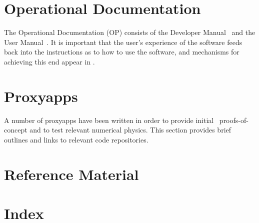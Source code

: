 \chapter{Operational Documentation}\label{sec:OP}
The Operational Documentation (OP) consists of the Developer Manual~ and
the User Manual~. It is important that
the user's experience of the software feeds back into the instructions
as to how to use the software, and mechanisms for achieving this end appear
in .

% 
% 
% 
% 

\chapter{Proxyapps}\label{sec:proxyapps}
A number of proxyapps have been written in order to provide initial \nep \ proofs-of-concept and to test relevant 
numerical physics.  This section provides brief outlines and links to relevant code repositories.


\chapter{Reference Material}\label{sec:REF}


\chapter{Index}\label{sec:IND}

